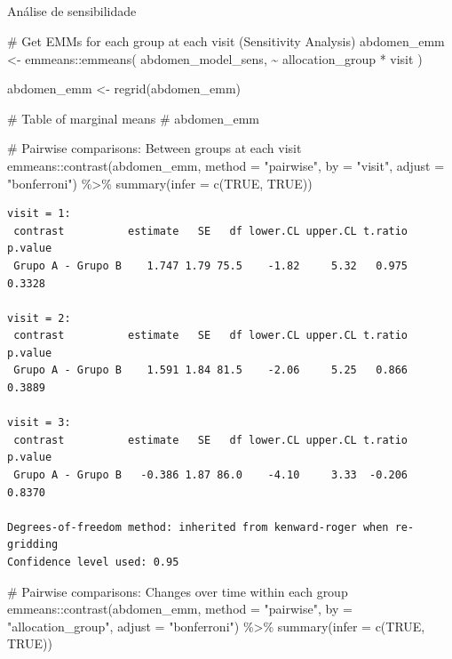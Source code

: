 \documentclass[
  12pt,
]{article}
\makeatletter
\let\oldsubparagraph\subparagraph
\renewcommand{\subparagraph}{
    \@ifstar
      \xxxSubParagraphStar
      \xxxSubParagraphNoStar
  }
\newcommand{\xxxSubParagraphStar}[1]{\oldsubparagraph*{#1}\mbox{}}
\newcommand{\xxxSubParagraphNoStar}[1]{\oldsubparagraph{#1}\mbox{}}
\newenvironment{Shaded}{\begin{snugshade}}{\end{snugshade}}
\newcommand{\AttributeTok}[1]{\textcolor[rgb]{0.40,0.45,0.13}{#1}}
\newcommand{\CommentTok}[1]{\textcolor[rgb]{0.37,0.37,0.37}{#1}}
\newcommand{\ConstantTok}[1]{\textcolor[rgb]{0.56,0.35,0.01}{#1}}
\newcommand{\FunctionTok}[1]{\textcolor[rgb]{0.28,0.35,0.67}{#1}}
\newcommand{\NormalTok}[1]{\textcolor[rgb]{0.00,0.23,0.31}{#1}}
\newcommand{\OtherTok}[1]{\textcolor[rgb]{0.00,0.23,0.31}{#1}}
\newcommand{\SpecialCharTok}[1]{\textcolor[rgb]{0.37,0.37,0.37}{#1}}
\newcommand{\StringTok}[1]{\textcolor[rgb]{0.13,0.47,0.30}{#1}}
\makeatother
\begin{document}
\subparagraph{Análise de
sensibilidade}\label{anuxe1lise-de-sensibilidade-13}

\begin{Shaded}
\begin{Highlighting}[]
\CommentTok{\# Get EMMs for each group at each visit (Sensitivity Analysis)}
\NormalTok{abdomen\_emm }\OtherTok{\textless{}{-}}\NormalTok{ emmeans}\SpecialCharTok{::}\FunctionTok{emmeans}\NormalTok{(}
\NormalTok{    abdomen\_model\_sens, }
    \SpecialCharTok{\textasciitilde{}}\NormalTok{ allocation\_group }\SpecialCharTok{*}\NormalTok{ visit}
\NormalTok{)}

\NormalTok{abdomen\_emm }\OtherTok{\textless{}{-}} \FunctionTok{regrid}\NormalTok{(abdomen\_emm)}

\CommentTok{\# Table of marginal means}
\CommentTok{\# abdomen\_emm}

\CommentTok{\# Pairwise comparisons: Between groups at each visit}
\NormalTok{emmeans}\SpecialCharTok{::}\FunctionTok{contrast}\NormalTok{(abdomen\_emm,}
\AttributeTok{method =} \StringTok{"pairwise"}\NormalTok{, }\AttributeTok{by =} \StringTok{"visit"}\NormalTok{,}
\AttributeTok{adjust =} \StringTok{"bonferroni"}\NormalTok{) }\SpecialCharTok{\%\textgreater{}\%} \FunctionTok{summary}\NormalTok{(}\AttributeTok{infer =} \FunctionTok{c}\NormalTok{(}\ConstantTok{TRUE}\NormalTok{, }\ConstantTok{TRUE}\NormalTok{))}
\end{Highlighting}
\end{Shaded}

\begin{verbatim}
visit = 1:
 contrast          estimate   SE   df lower.CL upper.CL t.ratio p.value
 Grupo A - Grupo B    1.747 1.79 75.5    -1.82     5.32   0.975  0.3328

visit = 2:
 contrast          estimate   SE   df lower.CL upper.CL t.ratio p.value
 Grupo A - Grupo B    1.591 1.84 81.5    -2.06     5.25   0.866  0.3889

visit = 3:
 contrast          estimate   SE   df lower.CL upper.CL t.ratio p.value
 Grupo A - Grupo B   -0.386 1.87 86.0    -4.10     3.33  -0.206  0.8370

Degrees-of-freedom method: inherited from kenward-roger when re-gridding 
Confidence level used: 0.95 
\end{verbatim}

\begin{Shaded}
\begin{Highlighting}[]
\CommentTok{\# Pairwise comparisons: Changes over time within each group}
\NormalTok{emmeans}\SpecialCharTok{::}\FunctionTok{contrast}\NormalTok{(abdomen\_emm,}
\AttributeTok{method =} \StringTok{"pairwise"}\NormalTok{, }\AttributeTok{by =} \StringTok{"allocation\_group"}\NormalTok{,}
\AttributeTok{adjust =} \StringTok{"bonferroni"}\NormalTok{) }\SpecialCharTok{\%\textgreater{}\%} \FunctionTok{summary}\NormalTok{(}\AttributeTok{infer =} \FunctionTok{c}\NormalTok{(}\ConstantTok{TRUE}\NormalTok{, }\ConstantTok{TRUE}\NormalTok{))}
\end{Highlighting}
\end{Shaded}
\end{document}
